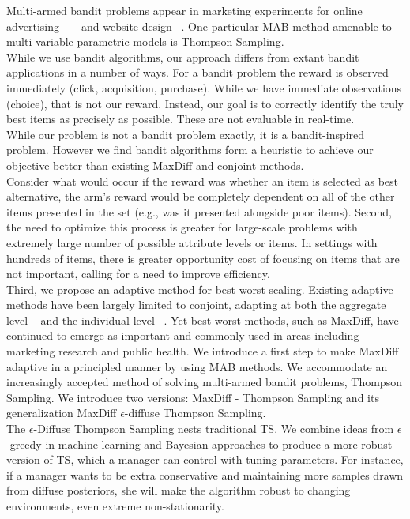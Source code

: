 \documentclass[nonblindrev]{informs3}
\begin{document}
Multi-armed bandit problems appear in marketing experiments for online advertising ~\cite{schwartz2015customer} ~\cite{urban2013morphing} and website design ~\cite{hauser2009website}. One particular MAB method amenable to multi-variable parametric models is Thompson Sampling.\\
While we use bandit algorithms, our approach differs from extant bandit applications in a number of ways. For a bandit problem the reward is observed immediately (click, acquisition, purchase). While we have immediate observations (choice), that is not our reward. Instead, our goal is to correctly identify the truly best items as precisely as possible. These are not evaluable in real-time. \\
While our problem is not a bandit problem exactly, it is a bandit-inspired problem. However we find bandit algorithms form a heuristic to achieve our objective better than existing MaxDiff and conjoint methods. \\
Consider what would occur if the reward was whether an item is selected as best alternative, the arm's reward would be completely dependent on all of the other items presented in the set (e.g., was it presented alongside poor items). 
Second, the need to optimize this process is greater for large-scale problems with extremely large number of possible attribute levels or items.  In settings with hundreds of items, there is greater opportunity cost of focusing on items that are not important, calling for a need to improve efficiency.\\
Third, we propose an adaptive method for best-worst scaling. Existing adaptive methods have been largely limited to conjoint, adapting at both the aggregate level ~\cite{arora2001improving} and the individual level ~\cite{toubia2004polyhedral}. Yet best-worst methods, such as MaxDiff, have continued to emerge as important and commonly used in areas including marketing research and public health. We introduce a first step to make MaxDiff adaptive in a principled manner by using MAB methods. We accommodate an increasingly accepted method of solving multi-armed bandit problems, Thompson Sampling. We introduce two versions: MaxDiff - Thompson Sampling and its generalization MaxDiff $\epsilon$-diffuse Thompson Sampling.\\
The $\epsilon$-Diffuse Thompson Sampling nests traditional TS. We combine ideas from $\epsilon$-greedy in machine learning and Bayesian approaches to produce a more robust version of TS,  which a manager can control with tuning parameters. For instance, if a manager wants to be extra conservative and maintaining more samples drawn from diffuse posteriors, she will make the algorithm robust to changing environments, even extreme non-stationarity. \\
\end{document}
